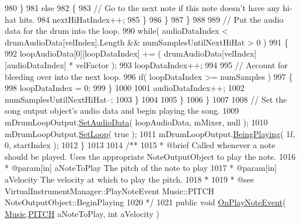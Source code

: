 \begin{DoxyCodeInclude}
980                         \}
981                         \textcolor{keywordflow}{else}
982                         \{
983                             \textcolor{comment}{// Go to the next note if this note doesn't have any hi-hat hits.}
984                             nextHiHatIndex++;
985                         \}
986                     \}
987                 \}
988 
989                 \textcolor{comment}{// Put the audio data for the drum into the loop.}
990                 \textcolor{keywordflow}{while}( audioDataIndex < drumAudioData[velIndex].Length && numSamplesUntilNextHiHat > 0 )
991                 \{
992                     loopAudioData[0][loopDataIndex] += ( drumAudioData[velIndex][audioDataIndex] * 
      velFactor );
993                     loopDataIndex++;
994 
995                     \textcolor{comment}{// Account for bleeding over into the next loop.}
996                     \textcolor{keywordflow}{if}( loopDataIndex >= numSamples )
997                     \{
998                         loopDataIndex = 0;
999                     \}
1000 
1001                     audioDataIndex++;
1002                     numSamplesUntilNextHiHat--;
1003                 \}
1004 
1005             \}
1006         \}
1007 
1008         \textcolor{comment}{// Set the song output object's audio data and begin playing the song.}
1009         mDrumLoopOutput.\hyperlink{group___n_o_o_pub_func_gaef9ab691f0a2671a62249d853f24162d}{SetAudioData}( loopAudioData, mMixer, null );
1010         mDrumLoopOutput.\hyperlink{group___n_o_o_pub_func_ga7b79bbd2c7a68831b322edff140f29d2}{SetLoop}( \textcolor{keyword}{true} );
1011         mDrumLoopOutput.\hyperlink{group___n_o_o_pub_func_ga2bdaa2787408f353f71ef6c6a18e9285}{BeingPlaying}( 1f, 0, startIndex );
1012     \}
1013 \textcolor{comment}{}
1014 \textcolor{comment}{    /**}
1015 \textcolor{comment}{     * @brief Called whenever a note should be played. Uses the appropriate NoteOutputObject to play the
       note.}
1016 \textcolor{comment}{     * @param[in] aNoteToPlay The pitch of the note to play}
1017 \textcolor{comment}{     * @param[in] aVelocity The velocity at which to play the pitch.}
1018 \textcolor{comment}{     * }
1019 \textcolor{comment}{     * @see VirtualInstrumentManager::PlayNoteEvent Music::PITCH NoteOutputObject::BeginPlaying}
1020 \textcolor{comment}{    */}
1021     \textcolor{keyword}{public} \textcolor{keywordtype}{void} \hyperlink{group___v_i_m_handlers_ga80b3821df3b1488a150f6062638f105c}{OnPlayNoteEvent}( \hyperlink{class_music}{Music}.\hyperlink{group___music_enums_ga508f69b199ea518f935486c990edac1d}{PITCH} aNoteToPlay, \textcolor{keywordtype}{int} aVelocity )

\end{DoxyCodeInclude}
